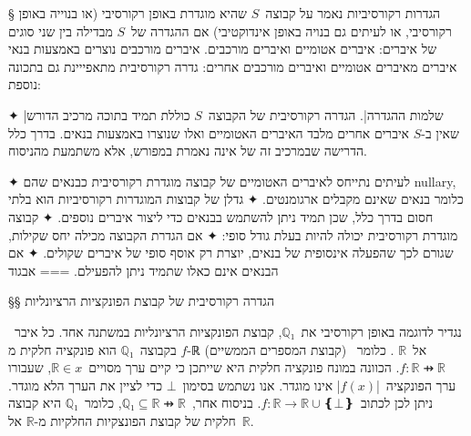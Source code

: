 § הגדרות רקורסיביות
נאמר על קבוצה~$S$ שהיא מוגדרת באופן רקורסיבי (או בנוייה באופן רקורסיבי, או
לעיתים גם בנויה באופן אינדוקטיבי) אם ההגדרה של~$S$ מבדילה בין שני סוגים של
איברים: איברים אטומיים ואיברים מורכבים.  איברים מורכבים נוצרים באמצעות בנאי
איברים מאיברים אטומיים ואיברים מורכבים אחרים:
גדרה רקורסיבית מתאפייינת גם בתכונה נוספת:
\begin{itemize}
  ✦ \ע|שלמות ההגדרה|. הגדרה רקורסיבית של הקבוצה~$S$ כוללת תמיד בתוכה מרכיב
  הדורש שאין ב-$S$ איברים אחרים מלבד האיברים האטומיים ואלו שנוצרו באמצעות בנאים.
  בדרך כלל הדרישה שבמרכיב זה של אינה נאמרת במפורש, אלא משתמעת מהניסוח. 
  \end{itemize}

✦ לעיתים נתייחס לאיברים האטומיים של קבוצה מוגדרת רקורסיבית כבנאים שהם nullary,
כלומר בנאים שאינם מקבלים ארגומנטים.
✦ גדלן של קבוצות המוגדרות רקורסיביות הוא בלתי חסום בדרך כלל, שכן תמיד ניתן
להשתמש בבנאים כדי ליצור איברים נוספים.
✦ קבוצה מוגדרת רקורסיבית יכולה להיות בעלת גודל סופי:
✦ אם הגדרת הקבוצה מכילה יחס שקילות, שגורם לכך שהפעלה אינסופית של בנאים, יוצרת
רק אוסף סופי של איברים שקולים.
✦ אם הבנאים אינם כאלו שתמיד ניתן להפעילם.
===
{אבגוד}


§§ הגדרה רקורסיבית של קבוצת הפונקציות הרציונליות

נגדיר לדוגמה באופן רקורסיבי את~$ℚ₁$, קבוצת הפונקציות הרציונליות במשתנה אחד. כל
איבר~$f$ בקבוצה~$ℚ₁$ הוא פונקציה חלקית מ-ℝ (קבוצת המספרים הממשיים) אל~$ℝ$ .
כלומר~$f:ℝ⇸ℝ$. הכוונה במונח פונקציה חלקית היא שייתכן כי קיים ערך מסויים~$ℝ∈x$,
שעבורו ערך הפונקציה~\E|$f(x)$| אינו מוגדר. אנו נשתמש בסימון~$⊥$ כדי לציין את הערך
הלא מוגדר. ניתן לכן לכתוב~$f:ℝ→ℝ∪❴⊥❵$. בניסוח אחר,~$ℚ₁⊆ℝ⇸ℝ$, כלומר~$ℚ₁$ היא
קבוצה חלקית של קבוצת הפונצקיות החלקיות מ-$ℝ$ אל~$ℝ$.

